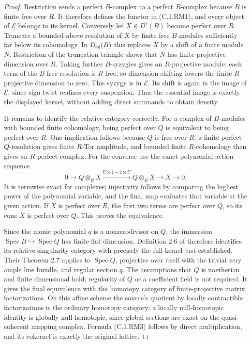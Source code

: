 \begin{proof}
Restriction sends a perfect $B$-complex
to a perfect $R$-complex because $B$
is finite free over $R$.
It therefore defines the functor in
(C.1.RM1), and every object of
$\underline{\mathcal E}$ belongs to
its kernel.
Conversely let $X\in D^b(B)$ become
perfect over $R$.
Truncate a bounded-above resolution
of $X$ by finite free $B$-modules
sufficiently far below its cohomology.
In $D_{\rm sg}(B)$ this replaces $X$
by a shift of a finite module $N$.
Restriction of the truncation triangle
shows that $N$ has finite projective
dimension over $R$.
Taking further $B$-syzygies gives an
$R$-projective module: each term of the
$B$-free resolution is $R$-free, so
dimension shifting lowers the finite
$R$-projective dimension to zero.
This syzygy is in $\mathcal E$.
Its shift is again in the image of
$\underline{\mathcal E}$, since sign
twist realizes every suspension.
Thus the essential image is exactly
the displayed kernel, without adding
direct summands to obtain density.

It remains to identify the relative
category correctly.  For a complex
of $B$-modules with bounded finite
cohomology, being perfect over $Q$
is equivalent to being perfect over
$R$.
One implication follows because $Q$
is free over $R$: a finite perfect
$Q$-resolution gives finite $R$-Tor
amplitude, and bounded finite
$R$-cohomology then gives an
$R$-perfect complex.
For the converse use the exact
polynomial-action sequence
\[
 0\longrightarrow Q\otimes_R X
  \xrightarrow{U\otimes1-1\otimes U}
  Q\otimes_R X\longrightarrow X\longrightarrow0.
                                                               \tag{C.1.RM6}
\]
It is termwise exact for complexes;
injectivity follows by comparing the
highest power of the polynomial
variable, and the final map evaluates
that variable at the given action.
If $X$ is perfect over $R$, the first
two terms are perfect over $Q$,
so its cone $X$ is perfect over $Q$.
This proves the equivalence.

Since the monic polynomial $q$ is a
nonzerodivisor on $Q$, the immersion
$\operatorname{Spec}B\hookrightarrow
\operatorname{Spec}Q$ has finite flat
dimension.  Definition 2.6 of
\cite{C-BurkeWalker2012} therefore
identifies its relative singularity
category with precisely the full
kernel just established.
Their Theorem 2.7 applies to
$\operatorname{Spec}Q$, projective
over itself with the trivial very
ample line bundle, and regular
section $q$.
The assumptions that $Q$ is
noetherian and finite dimensional
hold; regularity of $Q$ or a
coefficient field is not required.
It gives the final equivalence
with the homotopy category of
finite-projective matrix
factorizations.
On this affine scheme the source's
quotient by locally contractible
factorizations is the ordinary
homotopy category: a locally
null-homotopic identity is globally
null-homotopic, since global sections
are exact on the quasi-coherent
mapping complex.
Formula (C.1.RM3) follows by direct
multiplication, and its cokernel
is exactly the original lattice.


\end{proof}
